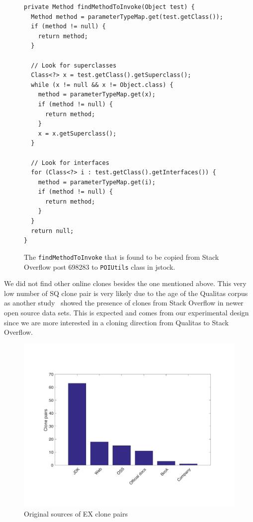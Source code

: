 \documentclass[10pt,journal,compsoc]{IEEEtran}
\begin{document}
\begin{figure}
	\begin{lstlisting}
private Method findMethodToInvoke(Object test) {
  Method method = parameterTypeMap.get(test.getClass());
  if (method != null) {
    return method;
  }

  // Look for superclasses
  Class<?> x = test.getClass().getSuperclass();
  while (x != null && x != Object.class) {
    method = parameterTypeMap.get(x);
    if (method != null) {
      return method;
    }
    x = x.getSuperclass();
  }

  // Look for interfaces
  for (Class<?> i : test.getClass().getInterfaces()) {
    method = parameterTypeMap.get(i);
    if (method != null) {
      return method;
    }
  }
  return null;
}
	\end{lstlisting}\vspace{-2ex}
	\caption{The {\small\texttt{findMethodToInvoke}} that is found to be copied from Stack Overflow post 698283 to {\small\texttt{POIUtils}} class in \textsf{jstock}.}
	\label{fig:jstock_code}
\end{figure}

We did not find other online clones besides the one mentioned above. 
This very low number of SQ clone pair is very likely due to the age of the
Qualitas corpus as another study~\cite{An2017} showed the presence of clones
from Stack Overflow in newer open source data sets. This is expected and
comes from our experimental design since
we are more interested in a cloning direction from Qualitas to Stack Overflow.

\begin{figure}
	\centering
	\includegraphics[width=0.9\linewidth]{ex_sources}
	\caption{Original sources of EX clone pairs}
	\label{fig:ex_sources}
\end{figure}
\end{document}
